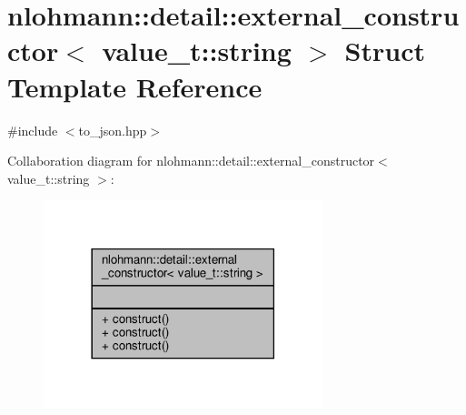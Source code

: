 \hypertarget{structnlohmann_1_1detail_1_1external__constructor_3_01value__t_1_1string_01_4}{}\section{nlohmann\+:\+:detail\+:\+:external\+\_\+constructor$<$ value\+\_\+t\+:\+:string $>$ Struct Template Reference}
\label{structnlohmann_1_1detail_1_1external__constructor_3_01value__t_1_1string_01_4}


{\ttfamily \#include $<$to\+\_\+json.\+hpp$>$}



Collaboration diagram for nlohmann\+:\+:detail\+:\+:external\+\_\+constructor$<$ value\+\_\+t\+:\+:string $>$\+:
\nopagebreak
\begin{figure}[H]
\begin{center}
\leavevmode
\includegraphics[width=230pt]{structnlohmann_1_1detail_1_1external__constructor_3_01value__t_1_1string_01_4__coll__graph}
\end{center}
\end{figure}
